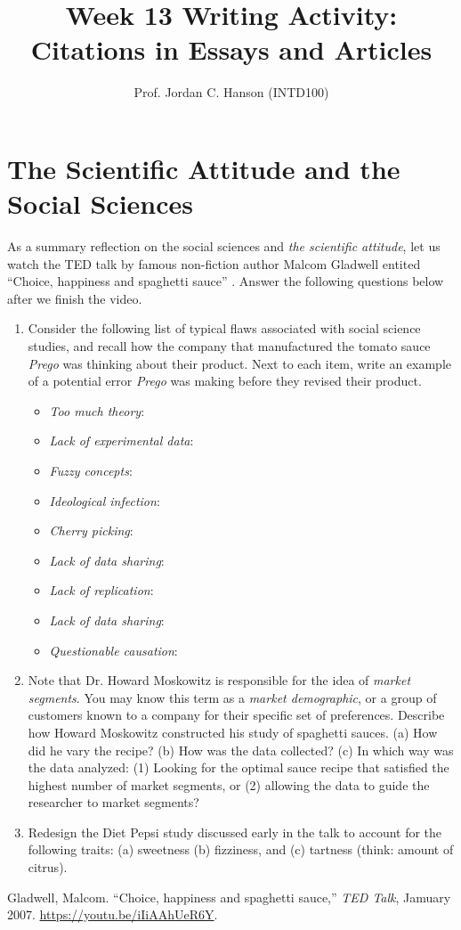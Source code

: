 \documentclass{article}
\begin{document}
\title{Week 13 Writing Activity: Citations in Essays and Articles}
\author{Prof. Jordan C. Hanson (INTD100)}

\maketitle

\section{The Scientific Attitude and the Social Sciences}

As a summary reflection on the social sciences and \textit{the scientific attitude}, let us watch the TED talk by famous non-fiction author Malcom Gladwell entited ``Choice, happiness and spaghetti sauce'' \cite{HH}.  Answer the following questions below after we finish the video.

\begin{enumerate}
\item Consider the following list of typical flaws associated with social science studies, and recall how the company that manufactured the tomato sauce \textit{Prego} was thinking about their product.  Next to each item, write an example of a potential error \textit{Prego} was making before they revised their product.
\begin{itemize}
\item \textit{Too much theory}:
\item \textit{Lack of experimental data}:
\item \textit{Fuzzy concepts}:
\item \textit{Ideological infection}:
\item \textit{Cherry picking}:
\item \textit{Lack of data sharing}:
\item \textit{Lack of replication}:
\item \textit{Lack of data sharing}:
\item \textit{Questionable causation}:
\end{itemize}
\item Note that Dr. Howard Moskowitz is responsible for the idea of \textit{market segments}.  You may know this term as a \textit{market demographic}, or a group of customers known to a company for their specific set of preferences.  Describe how Howard Moskowitz constructed his study of spaghetti sauces.  (a) How did he vary the recipe? (b) How was the data collected?  (c) In which way was the data analyzed: (1) Looking for the optimal sauce recipe that satisfied the highest number of market segments, or (2) allowing the data to guide the researcher to market segments?  \\ \vspace{2cm}
\item Redesign the Diet Pepsi study discussed early in the talk to account for the following traits: (a) sweetness (b) fizziness, and (c) tartness (think: amount of citrus). \\ \vspace{2cm}
\end{enumerate}

\begin{thebibliography}{10}
 Gladwell, Malcom. ``Choice, happiness and spaghetti sauce,'' \emph{TED Talk}, Jamuary 2007. \url{https://youtu.be/iIiAAhUeR6Y}.
\end{thebibliography}
\end{document}

